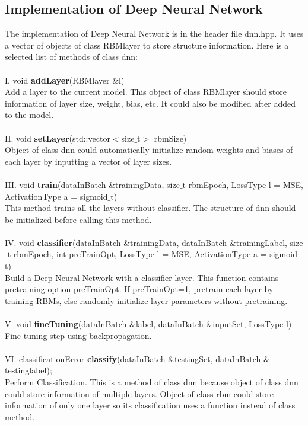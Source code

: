 \documentclass[12pt]{article}
\begin{document}
\subsection{Implementation of Deep Neural Network}
The implementation of Deep Neural Network is in the header file dnn.hpp. It uses a vector of objects of class RBMlayer to store structure information. Here is a selected list of methods of class dnn:\\
\\
I. void \textbf{addLayer}(RBMlayer $\&$l)\\
Add a layer to the current model. This object of class RBMlayer should store information of layer size, weight, bias, etc. It could also be modified after added to  the model.\\
\\
II. void \textbf{setLayer}(std::vector$<$size$\_$t$>$ rbmSize)\\
Object of class dnn could automatically initialize random weights and biases of each layer by inputting a vector of layer sizes.\\
\\
III. void \textbf{train}(dataInBatch $\&$trainingData, size$\_$t rbmEpoch, LossType l = MSE, ActivationType a = sigmoid$\_$t)\\
This method trains all the layers without classifier. The structure of dnn should be initialized before calling this method. \\
\\
IV. void \textbf{classifier}(dataInBatch $\&$trainingData, dataInBatch $\&$trainingLabel, size$\_$t rbmEpoch, int preTrainOpt, LossType l = MSE, ActivationType a = sigmoid$\_$t)\\
Build a Deep Neural Network with a classifier layer. This function contains pretraining option preTrainOpt. If preTrainOpt=1, pretrain each layer by training RBMs, else randomly initialize layer parameters without pretraining.\\
\\
V. void \textbf{fineTuning}(dataInBatch $\&$label, dataInBatch $\&$inputSet, LossType l)\\
Fine tuning step using backpropagation.\\
\\
VI. classificationError \textbf{classify}(dataInBatch $\&$testingSet, dataInBatch $\&$testinglabel);\\
Perform Classification. This is a method of class dnn because object of class dnn could store information of multiple layers. Object of class rbm could store information of only one layer so its classification uses a function instead of class method.  
\end{document}
